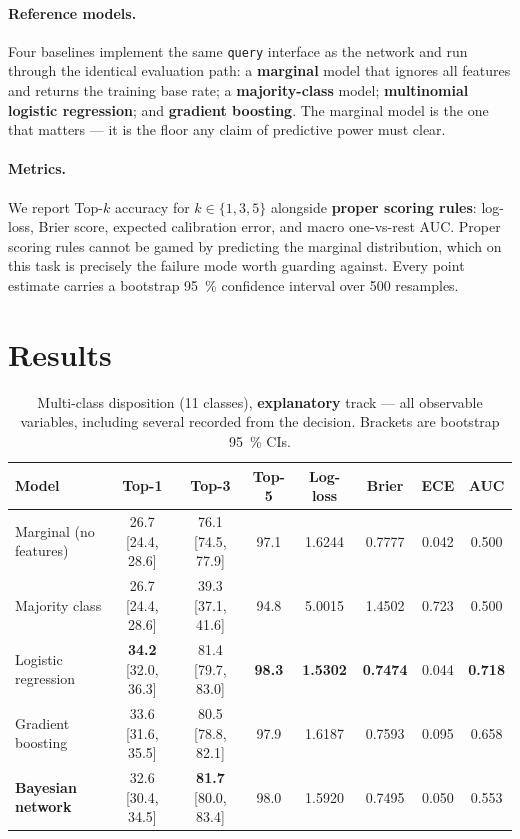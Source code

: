 \documentclass[11pt]{article}
\newcommand{\code}[1]{\texttt{#1}}
\begin{document}
\paragraph{Reference models.}
Four baselines implement the same \code{query} interface as the network and run
through the identical evaluation path: a \textbf{marginal} model that ignores
all features and returns the training base rate; a \textbf{majority-class}
model; \textbf{multinomial logistic regression}; and \textbf{gradient boosting}.
The marginal model is the one that matters --- it is the floor any claim of
predictive power must clear.

\paragraph{Metrics.}
We report Top-$k$ accuracy for $k \in \{1,3,5\}$ alongside \textbf{proper
scoring rules}: log-loss, Brier score, expected calibration error, and macro
one-vs-rest AUC. Proper scoring rules cannot be gamed by predicting the marginal
distribution, which on this task is precisely the failure mode worth guarding
against. Every point estimate carries a bootstrap \SI{95}{\percent} confidence
interval over 500 resamples.

\section{Results}
\label{sec:results}

\begin{table}[t]
\centering
\caption{Multi-class disposition (11 classes), \textbf{explanatory} track ---
all observable variables, including several recorded from the decision.
Brackets are bootstrap \SI{95}{\percent} CIs.}
\label{tab:explanatory}
\footnotesize
\setlength{\tabcolsep}{4pt}
\begin{tabular}{lccccccc}
\toprule
Model & Top-1 & Top-3 & Top-5 & Log-loss & Brier & ECE & AUC \\
\midrule
Marginal (no features) & 26.7 [24.4, 28.6] & 76.1 [74.5, 77.9] & 97.1 & 1.6244 & 0.7777 & 0.042 & 0.500 \\
Majority class         & 26.7 [24.4, 28.6] & 39.3 [37.1, 41.6] & 94.8 & 5.0015 & 1.4502 & 0.723 & 0.500 \\
Logistic regression    & \textbf{34.2} [32.0, 36.3] & 81.4 [79.7, 83.0] & \textbf{98.3} & \textbf{1.5302} & \textbf{0.7474} & 0.044 & \textbf{0.718} \\
Gradient boosting      & 33.6 [31.6, 35.5] & 80.5 [78.8, 82.1] & 97.9 & 1.6187 & 0.7593 & 0.095 & 0.658 \\
\textbf{Bayesian network} & 32.6 [30.4, 34.5] & \textbf{81.7} [80.0, 83.4] & 98.0 & 1.5920 & 0.7495 & 0.050 & 0.553 \\
\bottomrule
\end{tabular}
\end{table}
\end{document}
